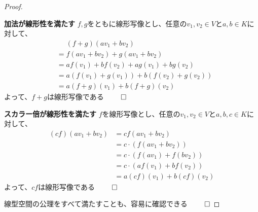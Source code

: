 \documentclass[../../../topic_linear-algebra]{subfiles}
\begin{document}
\begin{proof}
  \begin{subpattern}{\bfseries 加法が線形性を満たす}
    $f,g$をともに線形写像とし、任意の$v_1,v_2\in V$と$a,b\in K$に対して、
    \begin{align*}
       & \phantom{ = } (f+g)(av_1 + bv_2)          \\
       & = f(av_1 + bv_2) + g(av_1 + bv_2)         \\
       & = af(v_1) + bf(v_2) + ag(v_1) + bg(v_2)   \\
       & = a(f(v_1) + g(v_1)) + b(f(v_2) + g(v_2)) \\
       & = a(f+g)(v_1) + b(f+g)(v_2)
    \end{align*}
    よって、$f+g$は線形写像である $\qed$
  \end{subpattern}

  \begin{subpattern}{\bfseries スカラー倍が線形性を満たす}
    $f$を線形写像とし、任意の$v_1,v_2\in V$と$a,b,c\in K$に対して、
    \begin{align*}
      (cf)(av_1 + bv_2) & = c f(av_1 + bv_2)          \\
                        & = c\cdot(f(av_1 + bv_2))    \\
                        & = c\cdot(f(av_1) + f(bv_2)) \\
                        & = c\cdot(af(v_1) + bf(v_2)) \\
                        & = a(cf)(v_1) + b(cf)(v_2)
    \end{align*}
    よって、$cf$は線形写像である $\qed$
  \end{subpattern}

  線型空間の公理をすべて満たすことも、容易に確認できる $\qed$
\end{proof}
\end{document}
